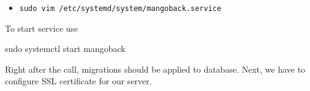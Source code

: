 \begin{itemize}
    \item \texttt{sudo vim /etc/systemd/system/mangoback.service}
\end{itemize}

To start service use

\begin{center}
    \begin{spverbatim}
        sudo systemctl start mangoback
    \end{spverbatim}
\end{center}

Right after the call, migrations should be applied to database.
Next, we have to configure SSL certificate for our server.

